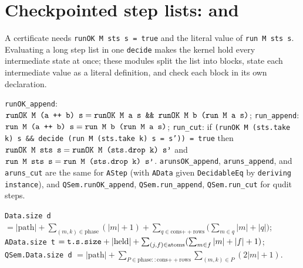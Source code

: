 \section{Checkpointed step lists: \texorpdfstring{}{PathSumChain} and \texorpdfstring{}{PathSumQuditChain}}\label{sec:lean-pathsum-chain}

A certificate needs \textnormal{\texttt{runOK M sts s = true}} and the literal value of \textnormal{\texttt{run M sts s}}.
Evaluating a long step list in one \textnormal{\texttt{decide}} makes the kernel hold every intermediate state at
once; these modules split the list into blocks, state each intermediate value as a literal
definition, and check each block in its own declaration.

\begin{theorem}\label{thm:lean-pathsum-cut}
\textnormal{\texttt{runOK\_\allowbreak{}append}}: $\textnormal{\texttt{runOK M (\allowbreak{}a ++ b) s}} = \textnormal{\texttt{runOK M a s \&\& runOK M b (\allowbreak{}run M a s)}}$;
\textnormal{\texttt{run\_\allowbreak{}append}}: $\textnormal{\texttt{run M (\allowbreak{}a ++ b) s}} = \textnormal{\texttt{run M b (\allowbreak{}run M a s)}}$;
\textnormal{\texttt{run\_\allowbreak{}cut}}: if \textnormal{\texttt{(\allowbreak{}runOK M (\allowbreak{}sts.\allowbreak{}take k) s \&\& decide (\allowbreak{}run M (\allowbreak{}sts.\allowbreak{}take k) s = s')) = true}}
then $\textnormal{\texttt{runOK M sts s}} = \textnormal{\texttt{runOK M (\allowbreak{}sts.\allowbreak{}drop k) s'}}$ and
$\textnormal{\texttt{run M sts s}} = \textnormal{\texttt{run M (\allowbreak{}sts.\allowbreak{}drop k) s'}}$. \textnormal{\texttt{arunsOK\_\allowbreak{}append}}, \textnormal{\texttt{aruns\_\allowbreak{}append}},
and \textnormal{\texttt{aruns\_\allowbreak{}cut}} are the same for \textnormal{\texttt{AStep}} (with \textnormal{\texttt{AData}} given \textnormal{\texttt{DecidableEq}} by
\textnormal{\texttt{deriving instance}}), and \textnormal{\texttt{QSem.\allowbreak{}runOK\_\allowbreak{}append}}, \textnormal{\texttt{QSem.\allowbreak{}run\_\allowbreak{}append}},
\textnormal{\texttt{QSem.\allowbreak{}run\_\allowbreak{}cut}} for qudit steps.
\end{theorem}

\begin{definition}\label{def:lean-pathsum-size}
\textnormal{\texttt{Data.\allowbreak{}size d}} $= |\text{path}| + \sum_{(m,k)\in\text{phase}}(|m|+1) + \sum_{q\in\text{cons}\mathbin{+\!\!+}\text{rows}}\bigl(\sum_{m\in q}|m| + |q|\bigr)$;
\textnormal{\texttt{AData.\allowbreak{}size t}} $=\textnormal{\texttt{t.\allowbreak{}s.\allowbreak{}size}} + |\text{held}| + \sum_{(j,f)\in\text{atoms}}(\sum_{m\in f}|m| + |f| + 1)$;
\textnormal{\texttt{QSem.\allowbreak{}Data.\allowbreak{}size d}} $=|\text{path}| + \sum_{P\in\text{phase}::\text{cons}\mathbin{+\!\!+}\text{rows}}\sum_{(m,k)\in P}(2|m|+1)$.
\end{definition}

